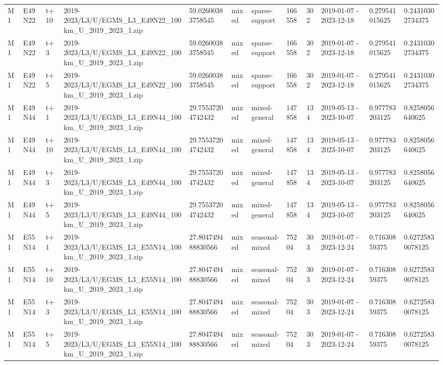 \begin{landscape}
\begin{longtable}{llllllllllll}
M1 & E49N22 & t+10 & 2019-2023/L3/U/EGMS\_L3\_E49N22\_100km\_U\_2019\_2023\_1.zip & 59.02600383758545 & mixed & sparse-support & 166558 & 302 & 2019-01-07 - 2023-12-18 & 0.279541015625 & 0.24310302734375 \\
M1 & E49N22 & t+3 & 2019-2023/L3/U/EGMS\_L3\_E49N22\_100km\_U\_2019\_2023\_1.zip & 59.02600383758545 & mixed & sparse-support & 166558 & 302 & 2019-01-07 - 2023-12-18 & 0.279541015625 & 0.24310302734375 \\
M1 & E49N22 & t+5 & 2019-2023/L3/U/EGMS\_L3\_E49N22\_100km\_U\_2019\_2023\_1.zip & 59.02600383758545 & mixed & sparse-support & 166558 & 302 & 2019-01-07 - 2023-12-18 & 0.279541015625 & 0.24310302734375 \\
M1 & E49N44 & t+1 & 2019-2023/L3/U/EGMS\_L3\_E49N44\_100km\_U\_2019\_2023\_1.zip & 29.75537204742432 & mixed & mixed-general & 147858 & 134 & 2019-05-13 - 2023-10-07 & 0.977783203125 & 0.8258056640625 \\
M1 & E49N44 & t+10 & 2019-2023/L3/U/EGMS\_L3\_E49N44\_100km\_U\_2019\_2023\_1.zip & 29.75537204742432 & mixed & mixed-general & 147858 & 134 & 2019-05-13 - 2023-10-07 & 0.977783203125 & 0.8258056640625 \\
M1 & E49N44 & t+3 & 2019-2023/L3/U/EGMS\_L3\_E49N44\_100km\_U\_2019\_2023\_1.zip & 29.75537204742432 & mixed & mixed-general & 147858 & 134 & 2019-05-13 - 2023-10-07 & 0.977783203125 & 0.8258056640625 \\
M1 & E49N44 & t+5 & 2019-2023/L3/U/EGMS\_L3\_E49N44\_100km\_U\_2019\_2023\_1.zip & 29.75537204742432 & mixed & mixed-general & 147858 & 134 & 2019-05-13 - 2023-10-07 & 0.977783203125 & 0.8258056640625 \\
M1 & E55N14 & t+1 & 2019-2023/L3/U/EGMS\_L3\_E55N14\_100km\_U\_2019\_2023\_1.zip & 27.804749488830566 & mixed & seasonal-mixed & 75204 & 303 & 2019-01-07 - 2023-12-24 & 0.71630859375 & 0.62725830078125 \\
M1 & E55N14 & t+10 & 2019-2023/L3/U/EGMS\_L3\_E55N14\_100km\_U\_2019\_2023\_1.zip & 27.804749488830566 & mixed & seasonal-mixed & 75204 & 303 & 2019-01-07 - 2023-12-24 & 0.71630859375 & 0.62725830078125 \\
M1 & E55N14 & t+3 & 2019-2023/L3/U/EGMS\_L3\_E55N14\_100km\_U\_2019\_2023\_1.zip & 27.804749488830566 & mixed & seasonal-mixed & 75204 & 303 & 2019-01-07 - 2023-12-24 & 0.71630859375 & 0.62725830078125 \\
M1 & E55N14 & t+5 & 2019-2023/L3/U/EGMS\_L3\_E55N14\_100km\_U\_2019\_2023\_1.zip & 27.804749488830566 & mixed & seasonal-mixed & 75204 & 303 & 2019-01-07 - 2023-12-24 & 0.71630859375 & 0.62725830078125 \\

\end{longtable}
\end{landscape}
